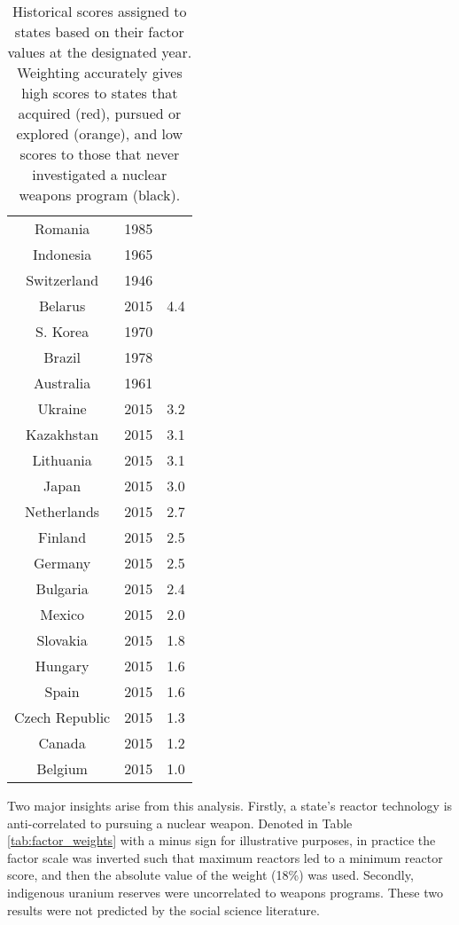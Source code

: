 \begin{table}
\begin{minipage}{.5\textwidth}
\begin{tabular}{|c|c|c|}
Romania & 1985 & \color{red}{4.5} \\
Indonesia & 1965 & \color{red}{4.4} \\
Switzerland & 1946 & \color{red}{4.4} \\
Belarus & 2015 & 4.4 \\
S. Korea & 1970 & \color{red}{4.4} \\
Brazil & 1978 & \color{red}{4.3} \\
Australia & 1961 & \color{red}{3.9} \\
Ukraine & 2015 & 3.2 \\
Kazakhstan & 2015 & 3.1 \\
Lithuania & 2015 & 3.1 \\
Japan & 2015 & 3.0 \\
Netherlands & 2015 & 2.7 \\
Finland & 2015 & 2.5 \\
Germany & 2015 & 2.5 \\
Bulgaria & 2015 & 2.4 \\
Mexico & 2015 & 2.0 \\
Slovakia & 2015 & 1.8 \\
Hungary & 2015 & 1.6 \\
Spain & 2015 & 1.6 \\
Czech Republic & 2015 & 1.3 \\
Canada & 2015 & 1.2 \\
Belgium & 2015 & 1.0 \\
\hline
\end{tabular}
\end{minipage}\hfill
\caption{Historical scores assigned to states based on their factor values at the designated year. Weighting accurately gives high scores to states that acquired (red), pursued or explored (orange), and low scores to those that never investigated a nuclear weapons program (black).}
\label{tab:state_scores}
\end{table}


Two major insights arise from this analysis. Firstly, a state's reactor technology is anti-correlated to pursuing a nuclear weapon.  Denoted in Table \ref{tab:factor_weights} with a minus sign for illustrative purposes, in practice the factor scale was inverted such that maximum reactors led to a minimum reactor score, and then the absolute value of the weight (18\%) was used.  Secondly, indigenous uranium reserves were uncorrelated to weapons programs. These two results were not predicted by the social science literature.


